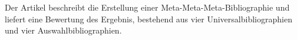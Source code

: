 Der Artikel beschreibt die Erstellung einer Meta-Meta-Meta-Bibliographie
und liefert eine Bewertung des Ergebnis, bestehend aus vier
Universalbibliographien und vier Auswahlbibliographien.
